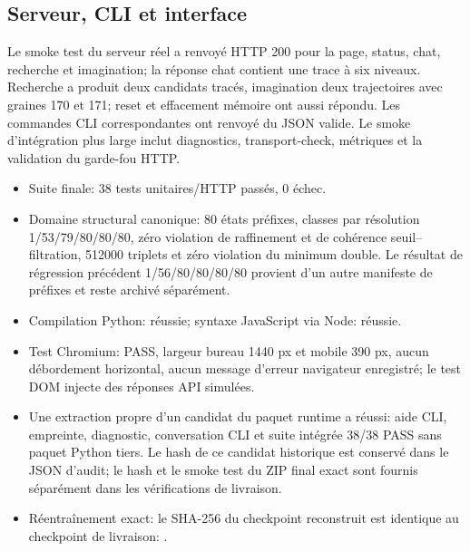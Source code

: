 \documentclass[11pt,a4paper]{article}
\begin{document}
\subsection{Serveur, CLI et interface}
Le smoke test du serveur réel a renvoyé HTTP 200 pour la page, status, chat, recherche et imagination; la réponse chat contient une trace à six niveaux. Recherche a produit deux candidats tracés, imagination deux trajectoires avec graines 170 et 171; reset et effacement mémoire ont aussi répondu. Les commandes CLI correspondantes ont renvoyé du JSON valide. Le smoke d'intégration plus large inclut diagnostics, transport-check, métriques et la validation du garde-fou HTTP.
\begin{itemize}[leftmargin=*]
\item Suite finale: 38 tests unitaires/HTTP passés, 0 échec.
\item Domaine structural canonique: 80 états préfixes, classes par résolution 1/53/79/80/80/80, zéro violation de raffinement et de cohérence seuil--filtration, 512000 triplets et zéro violation du minimum double. Le résultat de régression précédent 1/56/80/80/80/80 provient d’un autre manifeste de préfixes et reste archivé séparément.
\item Compilation Python: réussie; syntaxe JavaScript via Node: réussie.
\item Test Chromium: PASS, largeur bureau 1440 px et mobile 390 px, aucun débordement horizontal, aucun message d'erreur navigateur enregistré; le test DOM injecte des réponses API simulées.
\item Une extraction propre d’un candidat du paquet runtime a réussi: aide CLI, empreinte, diagnostic, conversation CLI et suite intégrée 38/38 PASS sans paquet Python tiers. Le hash de ce candidat historique est conservé dans le JSON d’audit; le hash et le smoke test du ZIP final exact sont fournis séparément dans les vérifications de livraison.
\item Réentraînement exact: le SHA-256 du checkpoint reconstruit est identique au checkpoint de livraison: \texttt{}.
\end{itemize}
\end{document}
